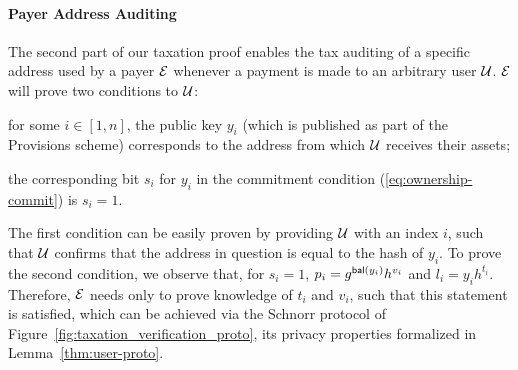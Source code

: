 \paragraph{Payer Address Auditing}\label{subsec:user-verification-proto}
The second part of our taxation proof enables the tax auditing of a specific
address used by a payer $\mathcal{E}$ whenever a payment is made to an arbitrary  user $\mathcal{U}$. $\mathcal{E}$ will prove two conditions to
$\mathcal{U}$:
\begin{inparaenum}[i)]
    \item for some $i \in [1, n]$, the public key $y_i$ (which is published as
        part of the Provisions scheme) corresponds to the address from which
        $\mathcal{U}$ receives their assets;
    \item the corresponding bit $s_i$ for $y_i$ in the commitment condition
        (\ref{eq:ownership-commit}) is $s_i = 1$.
\end{inparaenum}
The first condition can be easily proven by providing $\mathcal{U}$ with an index
$i$, such that $\mathcal{U}$ confirms that the address in question is equal to the
hash of $y_i$. To prove the second condition, we observe that, for $s_i = 1$,
$p_i = g^{\mathsf{bal}(y_i)}h^{v_i}$ and
$l_i = y_ih^{t_i}$.
Therefore, $\mathcal{E}$ needs only to prove knowledge of $t_i$ and $v_i$, such that this
statement is satisfied, which can be achieved via the Schnorr protocol
of Figure~\ref{fig:taxation_verification_proto}, its privacy properties formalized in
Lemma~\ref{thm:user-proto}.


